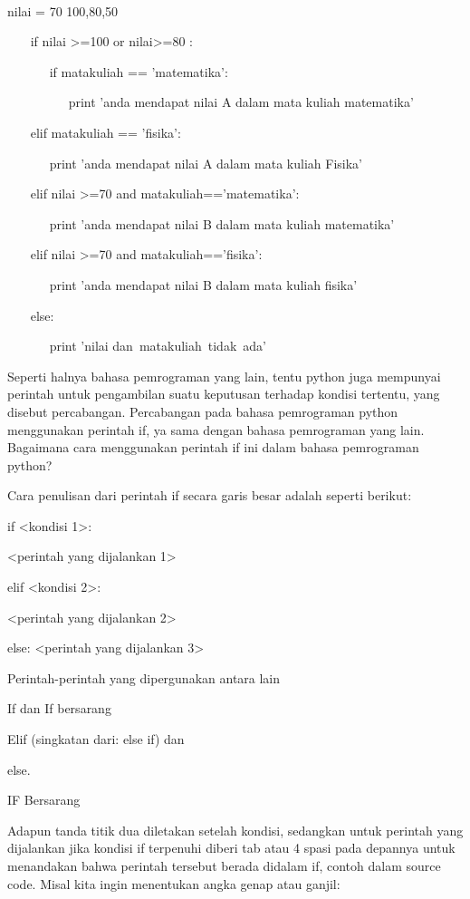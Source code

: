 ~~  
 
 nilai = 70 100,80,50 

 
~~~ if nilai >=100 or nilai>=80 : 

 
~~~~~~ if matakuliah == 'matematika': 

 
~~~~~~~~~ print 'anda mendapat nilai A dalam mata kuliah matematika' 

 
~~~ elif matakuliah == 'fisika': 

 
~~~~~~ print 'anda mendapat nilai A dalam mata kuliah Fisika' 

 
~~~ elif nilai >=70 and matakuliah=='matematika': 


 
~~~~~~ print 'anda mendapat nilai B dalam mata kuliah matematika' 

 
~~~ elif nilai >=70 and matakuliah=='fisika': 

 
~~~~~~ print 'anda mendapat nilai B dalam mata kuliah fisika' 

 
~~~ else: 

 
~~~~~~ print 'nilai dan~matakuliah~tidak~ada'~~~     

 
Seperti halnya bahasa pemrograman yang lain, tentu python juga mempunyai perintah untuk pengambilan suatu keputusan terhadap kondisi tertentu, yang disebut percabangan. Percabangan pada bahasa pemrograman python menggunakan perintah if, ya sama dengan bahasa pemrograman yang lain. Bagaimana cara menggunakan perintah if ini dalam bahasa pemrograman python? 
 

Cara penulisan dari perintah if secara garis besar adalah seperti berikut: 
 


if <kondisi 1>: 
 

   <perintah yang dijalankan 1> 
 

elif <kondisi 2>: 
 

<perintah yang dijalankan 2> 
 

else:
   <perintah yang dijalankan 3> 
 


Perintah-perintah yang dipergunakan antara lain 
 

If dan If bersarang 
 

Elif (singkatan dari: else if) dan 
 

else.
 
 

IF Bersarang 
 

Adapun tanda titik dua diletakan setelah kondisi, sedangkan untuk perintah yang dijalankan jika kondisi if terpenuhi diberi tab atau 4 spasi pada depannya untuk menandakan bahwa perintah tersebut berada didalam if, contoh dalam source code. Misal kita ingin menentukan angka genap atau ganjil: 
 

